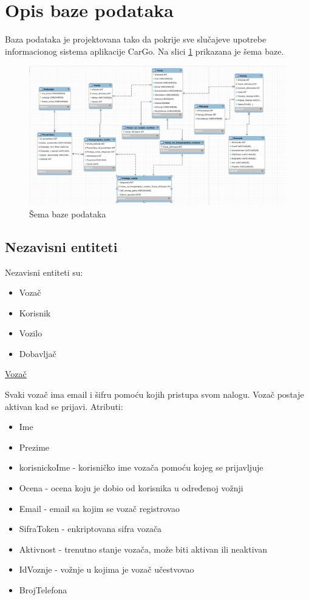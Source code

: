 \section{\bfseries Opis baze podataka}
Baza podataka je projektovana tako da pokrije sve slučajeve upotrebe informacionog sistema aplikacije CarGo. Na slici \ref{fig:bazaPodataka} prikazana je šema baze.

\begin{figure}[H]
\begin{center}
\includegraphics[width=\textwidth]{Slike/EERDijagramBazePodataka.png}
\end{center}
    \caption{Šema baze podataka}
\label{fig:bazaPodataka}
\end{figure}

\subsection{\textbf{Nezavisni entiteti}}Nezavisni entiteti su:
    \begin{itemize}
        \item Vozač
        \item Korisnik
        \item Vozilo
        \item Dobavljač
    \end{itemize}

\begin{flushleft}
\underline{Vozač}
\end{flushleft}
Svaki vozač ima email i šifru pomoću kojih pristupa svom nalogu. Vozač postaje aktivan kad se prijavi. Atributi:
\begin{itemize}
    \item Ime
    \item Prezime
    \item korisnickoIme - korisničko ime vozača pomoću kojeg se prijavljuje
    \item Ocena - ocena koju je dobio od korisnika u određenoj vožnji
    \item Email - email sa kojim se vozač registrovao
    \item SifraToken - enkriptovana sifra vozača
    \item Aktivnost - trenutno stanje vozača, može biti aktivan ili neaktivan
    \item IdVoznje - vožnje u kojima je vozač učestvovao
    \item BrojTelefona
\end{itemize}

